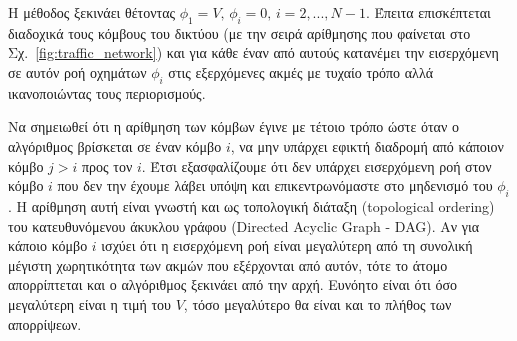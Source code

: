 \documentclass[a4paper,12pt]{article}
\begin{document}
Η μέθοδος ξεκινάει θέτοντας $\phi_1 = V, \, \phi_i = 0, \, i=2,...,N-1$. Έπειτα επισκέπτεται διαδοχικά 
τους κόμβους του δικτύου (με την σειρά αρίθμησης που φαίνεται στο Σχ.~\ref{fig:traffic_network}) και για κάθε έναν
από αυτούς κατανέμει την εισερχόμενη σε αυτόν ροή οχημάτων $\phi_i$ στις εξερχόμενες ακμές με τυχαίο τρόπο αλλά 
ικανοποιώντας τους περιορισμούς. 

Να σημειωθεί ότι η αρίθμηση των κόμβων έγινε με τέτοιο τρόπο ώστε όταν ο αλγόριθμος βρίσκεται σε έναν κόμβο $i$, 
να μην υπάρχει εφικτή διαδρομή από κάποιον κόμβο $j > i$ προς τον $i$. Έτσι εξασφαλίζουμε ότι δεν 
υπάρχει εισερχόμενη ροή στον κόμβο $i$ που δεν την έχουμε λάβει υπόψη και επικεντρωνόμαστε στο μηδενισμό του 
$\phi_i$. Η αρίθμηση αυτή είναι γνωστή και ως τοπολογική διάταξη (topological
ordering) του κατευθυνόμενου άκυκλου γράφου
(Directed Acyclic Graph - DAG). Αν για κάποιο κόμβο $i$ ισχύει ότι η εισερχόμενη ροή είναι 
μεγαλύτερη από τη συνολική μέγιστη χωρητικότητα των ακμών που εξέρχονται από αυτόν, τότε το άτομο απορρίπτεται 
και ο αλγόριθμος ξεκινάει από την αρχή. Ευνόητο είναι ότι όσο μεγαλύτερη είναι η τιμή του $V$, τόσο μεγαλύτερο θα 
είναι και το πλήθος των απορρίψεων.
\end{document}

